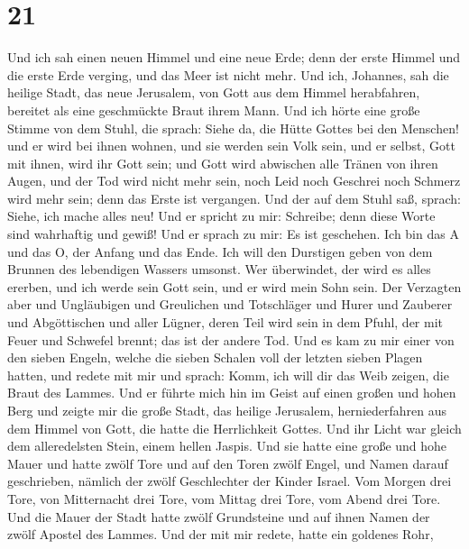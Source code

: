 \hypertarget{section-20}{%
\section{21}\label{section-20}}

 Und ich sah einen neuen Himmel und eine neue Erde; denn der
erste Himmel und die erste Erde verging, und das Meer ist nicht mehr.
 Und ich, Johannes, sah die heilige Stadt, das neue
Jerusalem, von Gott aus dem Himmel herabfahren, bereitet als eine
geschmückte Braut ihrem Mann.  Und ich hörte eine große
Stimme von dem Stuhl, die sprach: Siehe da, die Hütte Gottes bei den
Menschen! und er wird bei ihnen wohnen, und sie werden sein Volk sein,
und er selbst, Gott mit ihnen, wird ihr Gott sein;  und Gott
wird abwischen alle Tränen von ihren Augen, und der Tod wird nicht mehr
sein, noch Leid noch Geschrei noch Schmerz wird mehr sein; denn das
Erste ist vergangen.  Und der auf dem Stuhl saß, sprach:
Siehe, ich mache alles neu! Und er spricht zu mir: Schreibe; denn diese
Worte sind wahrhaftig und gewiß!  Und er sprach zu mir: Es
ist geschehen. Ich bin das A und das O, der Anfang und das Ende. Ich
will den Durstigen geben von dem Brunnen des lebendigen Wassers umsonst.
 Wer überwindet, der wird es alles ererben, und ich werde
sein Gott sein, und er wird mein Sohn sein.  Der Verzagten
aber und Ungläubigen und Greulichen und Totschläger und Hurer und
Zauberer und Abgöttischen und aller Lügner, deren Teil wird sein in dem
Pfuhl, der mit Feuer und Schwefel brennt; das ist der andere Tod.
 Und es kam zu mir einer von den sieben Engeln, welche die
sieben Schalen voll der letzten sieben Plagen hatten, und redete mit mir
und sprach: Komm, ich will dir das Weib zeigen, die Braut des Lammes.
 Und er führte mich hin im Geist auf einen großen und hohen
Berg und zeigte mir die große Stadt, das heilige Jerusalem,
herniederfahren aus dem Himmel von Gott,  die hatte die
Herrlichkeit Gottes. Und ihr Licht war gleich dem alleredelsten Stein,
einem hellen Jaspis.  Und sie hatte eine große und hohe
Mauer und hatte zwölf Tore und auf den Toren zwölf Engel, und Namen
darauf geschrieben, nämlich der zwölf Geschlechter der Kinder Israel.
 Vom Morgen drei Tore, von Mitternacht drei Tore, vom
Mittag drei Tore, vom Abend drei Tore.  Und die Mauer der
Stadt hatte zwölf Grundsteine und auf ihnen Namen der zwölf Apostel des
Lammes.  Und der mit mir redete, hatte ein goldenes Rohr,
